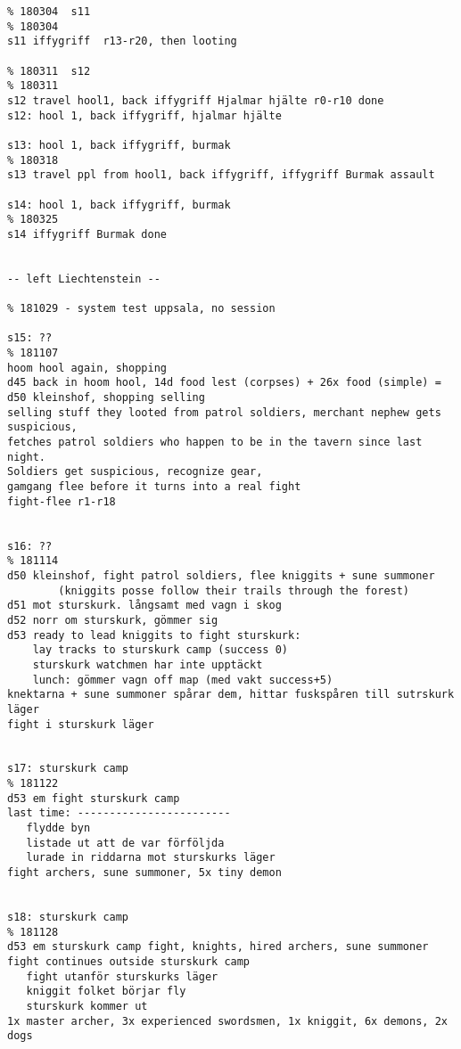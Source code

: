 \begin{verbatim}
% 180304  s11                                                           % 180304
s11 iffygriff  r13-r20, then looting

% 180311  s12                                                           % 180311
s12 travel hool1, back iffygriff Hjalmar hjälte r0-r10 done
s12: hool 1, back iffygriff, hjalmar hjälte

s13: hool 1, back iffygriff, burmak                                     % 180318
s13 travel ppl from hool1, back iffygriff, iffygriff Burmak assault

s14: hool 1, back iffygriff, burmak                                     % 180325
s14 iffygriff Burmak done


-- left Liechtenstein --

% 181029 - system test uppsala, no session

s15: ??                                                                 % 181107
hoom hool again, shopping
d45 back in hoom hool, 14d food lest (corpses) + 26x food (simple) =  
d50 kleinshof, shopping selling
selling stuff they looted from patrol soldiers, merchant nephew gets suspicious,
fetches patrol soldiers who happen to be in the tavern since last night.
Soldiers get suspicious, recognize gear,
gamgang flee before it turns into a real fight
fight-flee r1-r18


s16: ??                                                                 % 181114
d50 kleinshof, fight patrol soldiers, flee kniggits + sune summoner
        (kniggits posse follow their trails through the forest)
d51 mot sturskurk. långsamt med vagn i skog
d52 norr om sturskurk, gömmer sig
d53 ready to lead kniggits to fight sturskurk:
    lay tracks to sturskurk camp (success 0)
    sturskurk watchmen har inte upptäckt
    lunch: gömmer vagn off map (med vakt success+5)
knektarna + sune summoner spårar dem, hittar fuskspåren till sutrskurk läger
fight i sturskurk läger


s17: sturskurk camp                                                     % 181122
d53 em fight sturskurk camp
last time: ------------------------
   flydde byn
   listade ut att de var förföljda
   lurade in riddarna mot sturskurks läger
fight archers, sune summoner, 5x tiny demon


s18: sturskurk camp                                                     % 181128
d53 em sturskurk camp fight, knights, hired archers, sune summoner
fight continues outside sturskurk camp
   fight utanför sturskurks läger
   kniggit folket börjar fly
   sturskurk kommer ut
1x master archer, 3x experienced swordsmen, 1x kniggit, 6x demons, 2x dogs



\end{verbatim}

